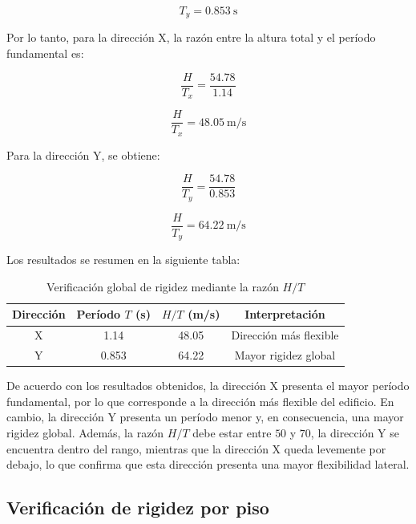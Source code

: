 \begin{equation}
T_y = 0.853 \ \text{s}
\end{equation}

Por lo tanto, para la dirección X, la razón entre la altura total y el período fundamental es:

\begin{equation}
\frac{H}{T_x} = \frac{54.78}{1.14}
\end{equation}

\begin{equation}
\frac{H}{T_x} = 48.05 \ \text{m/s}
\end{equation}

Para la dirección Y, se obtiene:

\begin{equation}
\frac{H}{T_y} = \frac{54.78}{0.853}
\end{equation}

\begin{equation}
\frac{H}{T_y} = 64.22 \ \text{m/s}
\end{equation}

Los resultados se resumen en la siguiente tabla:

\begin{table}[H]
\centering
\caption{Verificación global de rigidez mediante la razón $H/T$}
\begin{tabular}{cccc}
\hline
Dirección & Período $T$ (s) & $H/T$ (m/s) & Interpretación \\
\hline
X & 1.14 & 48.05 & Dirección más flexible \\
Y & 0.853 & 64.22 & Mayor rigidez global \\
\hline
\end{tabular}
\end{table}

De acuerdo con los resultados obtenidos, la dirección X presenta el mayor período fundamental, por lo que corresponde a la dirección más flexible del edificio. En cambio, la dirección Y presenta un período menor y, en consecuencia, una mayor rigidez global. Además, la razón $H/T$ debe estar entre $50$ y $70$, la dirección Y se encuentra dentro del rango, mientras que la dirección X queda levemente por debajo, lo que confirma que esta dirección presenta una mayor flexibilidad lateral.

\subsection{Verificación de rigidez por piso}

